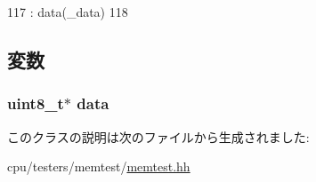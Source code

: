 \begin{DoxyCode}
117             : data(_data)
118         { }
\end{DoxyCode}


\subsection{変数}
\hypertarget{classMemTest_1_1MemTestSenderState_abe222f6d3581e7920dcad5306cc906a8}{
\subsubsection[{data}]{\setlength{\rightskip}{0pt plus 5cm}uint8\_\-t$\ast$ {\bf data}}}
\label{classMemTest_1_1MemTestSenderState_abe222f6d3581e7920dcad5306cc906a8}


このクラスの説明は次のファイルから生成されました:\begin{DoxyCompactItemize}
\item 
cpu/testers/memtest/\hyperlink{memtest_8hh}{memtest.hh}\end{DoxyCompactItemize}
